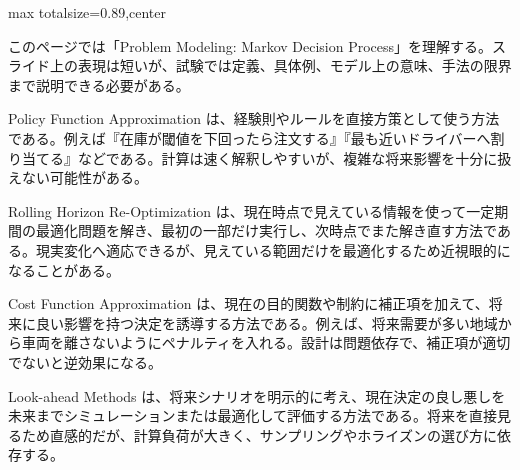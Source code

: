 \begin{minipage}[t]{0.58\textwidth}
\begin{adjustbox}{max totalsize={\textwidth}{0.89\textheight},center}
\begin{minipage}{\textwidth}\scriptsize
{}このページでは「Problem Modeling: Markov Decision Process」を理解する。スライド上の表現は短いが、試験では定義、具体例、モデル上の意味、手法の限界まで説明できる必要がある。\par
Policy Function Approximation は、経験則やルールを直接方策として使う方法である。例えば『在庫が閾値を下回ったら注文する』『最も近いドライバーへ割り当てる』などである。計算は速く解釈しやすいが、複雑な将来影響を十分に扱えない可能性がある。\par
Rolling Horizon Re-Optimization は、現在時点で見えている情報を使って一定期間の最適化問題を解き、最初の一部だけ実行し、次時点でまた解き直す方法である。現実変化へ適応できるが、見えている範囲だけを最適化するため近視眼的になることがある。\par
Cost Function Approximation は、現在の目的関数や制約に補正項を加えて、将来に良い影響を持つ決定を誘導する方法である。例えば、将来需要が多い地域から車両を離さないようにペナルティを入れる。設計は問題依存で、補正項が適切でないと逆効果になる。\par
Look-ahead Methods は、将来シナリオを明示的に考え、現在決定の良し悪しを未来までシミュレーションまたは最適化して評価する方法である。将来を直接見るため直感的だが、計算負荷が大きく、サンプリングやホライズンの選び方に依存する。\par

\end{minipage}
\end{adjustbox}
\end{minipage}
